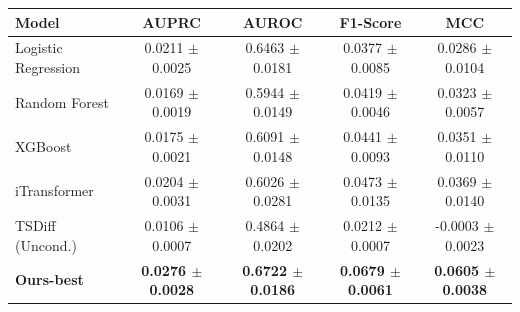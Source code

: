 \begin{tabular}{lcccc}
\toprule
\textbf{Model} & \textbf{AUPRC} & \textbf{AUROC} & \textbf{F1-Score} & \textbf{MCC} \\
\midrule
Logistic Regression & 0.0211 $\pm$ 0.0025 & 0.6463 $\pm$ 0.0181 & 0.0377 $\pm$ 0.0085 & 0.0286 $\pm$ 0.0104 \\
Random Forest & 0.0169 $\pm$ 0.0019 & 0.5944 $\pm$ 0.0149 & 0.0419 $\pm$ 0.0046 & 0.0323 $\pm$ 0.0057 \\
XGBoost & 0.0175 $\pm$ 0.0021 & 0.6091 $\pm$ 0.0148 & 0.0441 $\pm$ 0.0093 & 0.0351 $\pm$ 0.0110 \\
iTransformer & 0.0204 $\pm$ 0.0031 & 0.6026 $\pm$ 0.0281 & 0.0473 $\pm$ 0.0135 & 0.0369 $\pm$ 0.0140 \\
TSDiff (Uncond.) & 0.0106 $\pm$ 0.0007 & 0.4864 $\pm$ 0.0202 & 0.0212 $\pm$ 0.0007 & -0.0003 $\pm$ 0.0023 \\
\midrule
\textbf{Ours-best} & \textbf{0.0276 $\pm$ 0.0028} & \textbf{0.6722 $\pm$ 0.0186} & \textbf{0.0679 $\pm$ 0.0061} & \textbf{0.0605 $\pm$ 0.0038} \\
\bottomrule
\end{tabular}
